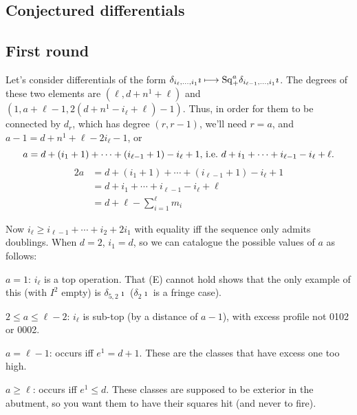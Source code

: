 \documentclass[10pt]{article}
\newcommand{\SqShift}{\Sq_{\smash{+}}}
\newcommand{\Sq}{\mathrm{Sq}}
\begin{document}
\begin{conjectured differentials}
\pagebreak
\section{Conjectured differentials}
\subsection{First round}
Let's consider differentials of the form $\delta_{i_\ell,\ldots,i_1}\imath\mapsto \SqShift^a\delta_{i_{\ell-1},\ldots,i_1}\imath$. The degrees of these two elements are $(\ell,d+n^1+\ell)$ and $(1,a+\ell-1,2(d+n^1-i_\ell+\ell)-1)$. Thus, in order for them to be connected by $d_r$, which has degree $(r,r-1)$, we'll need $r=a$, and $a-1=d+n^1+\ell-2i_\ell-1$, or
\[a=d+(i_1+1)+\cdots +(i_{\ell-1}+1)-i_\ell+1\textup{, i.e.\ }d+i_1+\cdots +i_{\ell-1}-i_\ell+\ell.\]
\begin{alignat*}{2}
a
&=
d+(i_1+1)+\cdots +(i_{\ell-1}+1)-i_\ell+1%
\\
&=
d+i_1+\cdots +i_{\ell-1}-i_\ell+\ell\\
&=
d+\ell-\textstyle\sum_{i=1}^\ell m_i%
\end{alignat*}

Now $i_\ell\geq i_{\ell-1}+\cdots +i_2+2i_1$ with equality iff the sequence only admits doublings. When $d=2$, $i_1=d$, so we can catalogue the possible values of $a$ as follows:
\begin{itemise}
\setlength{\parindent}{.25in}
\item $a=1$: $i_\ell$ is a top operation. That (E) cannot hold shows that the only example of this (with $I^2$ empty) is $\delta_{5,2}\imath$ ($\delta_{2}\imath$ is a fringe case).
\item $2\leq a\leq\ell-2$: $i_\ell$ is sub-top (by a distance of $a-1$), with excess profile not 0102 or 0002.
\item $a=\ell-1$: occurs iff $e^1=d+1$. These are the classes that have excess one too high.
\item $a\geq\ell$:  occurs iff $e^1\leq d$. These classes are supposed to be exterior in the abutment, so you want them to have their squares hit (and never to fire).


\end{itemise}
\end{conjectured differentials}
\end{document}
